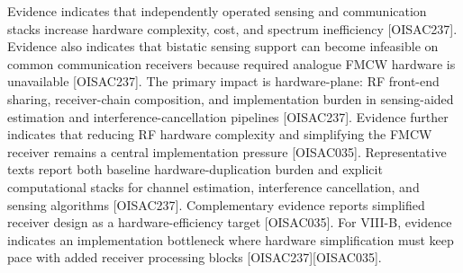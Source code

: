 {}
\markdownRendererSectionEnd \markdownRendererSectionBegin
{}\markdownRendererInterblockSeparator
{}\markdownRendererOlBegin
{} Evidence indicates that independently operated sensing and communication stacks increase hardware complexity, cost, and spectrum inefficiency [O\markdownRendererUnderscore{}ISAC\markdownRendererUnderscore{}237]. Evidence also indicates that bistatic sensing support can become infeasible on common communication receivers because required analogue FMCW hardware is unavailable [O\markdownRendererUnderscore{}ISAC\markdownRendererUnderscore{}237].\markdownRendererOlItemEnd 
{} The primary impact is hardware-plane: RF front-end sharing, receiver-chain composition, and implementation burden in sensing-aided estimation and interference-cancellation pipelines [O\markdownRendererUnderscore{}ISAC\markdownRendererUnderscore{}237]. Evidence further indicates that reducing RF hardware complexity and simplifying the FMCW receiver remains a central implementation pressure [O\markdownRendererUnderscore{}ISAC\markdownRendererUnderscore{}035].\markdownRendererOlItemEnd 
{} Representative texts report both baseline hardware-duplication burden and explicit computational stacks for channel estimation, interference cancellation, and sensing algorithms [O\markdownRendererUnderscore{}ISAC\markdownRendererUnderscore{}237]. Complementary evidence reports simplified receiver design as a hardware-efficiency target [O\markdownRendererUnderscore{}ISAC\markdownRendererUnderscore{}035].\markdownRendererOlItemEnd 
{} For VIII-B, evidence indicates an implementation bottleneck where hardware simplification must keep pace with added receiver processing blocks [O\markdownRendererUnderscore{}ISAC\markdownRendererUnderscore{}237][O\markdownRendererUnderscore{}ISAC\markdownRendererUnderscore{}035].\markdownRendererOlItemEnd 
\markdownRendererOlEnd \markdownRendererInterblockSeparator
